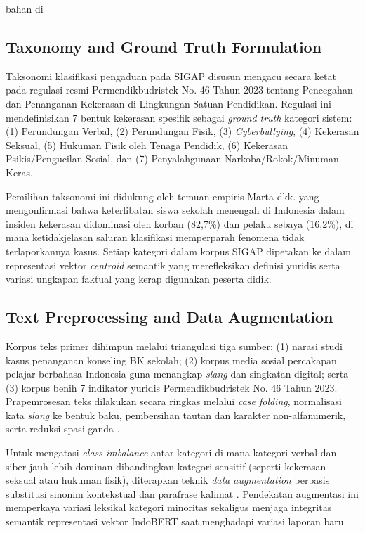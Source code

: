bahan di\documentclass[conference]{IEEEtran}
\begin{document}
\subsection{Taxonomy and Ground Truth Formulation}

Taksonomi klasifikasi pengaduan pada SIGAP disusun mengacu secara ketat pada regulasi resmi Permendikbudristek No. 46 Tahun 2023 tentang Pencegahan dan Penanganan Kekerasan di Lingkungan Satuan Pendidikan. Regulasi ini mendefinisikan 7 bentuk kekerasan spesifik sebagai \textit{ground truth} kategori sistem: (1) Perundungan Verbal, (2) Perundungan Fisik, (3) \textit{Cyberbullying}, (4) Kekerasan Seksual, (5) Hukuman Fisik oleh Tenaga Pendidik, (6) Kekerasan Psikis/Pengucilan Sosial, dan (7) Penyalahgunaan Narkoba/Rokok/Minuman Keras.

Pemilihan taksonomi ini didukung oleh temuan empiris Marta dkk. \cite{marta2026} yang mengonfirmasi bahwa keterlibatan siswa sekolah menengah di Indonesia dalam insiden kekerasan didominasi oleh korban (82,7\%) dan pelaku sebaya (16,2\%), di mana ketidakjelasan saluran klasifikasi memperparah fenomena tidak terlaporkannya kasus. Setiap kategori dalam korpus SIGAP dipetakan ke dalam representasi vektor \textit{centroid} semantik yang merefleksikan definisi yuridis serta variasi ungkapan faktual yang kerap digunakan peserta didik.

\subsection{Text Preprocessing and Data Augmentation}

Korpus teks primer dihimpun melalui triangulasi tiga sumber: (1) narasi studi kasus penanganan konseling BK sekolah; (2) korpus media sosial percakapan pelajar berbahasa Indonesia guna menangkap \textit{slang} dan singkatan digital; serta (3) korpus benih 7 indikator yuridis Permendikbudristek No. 46 Tahun 2023. Prapemrosesan teks dilakukan secara ringkas melalui \textit{case folding}, normalisasi kata \textit{slang} ke bentuk baku, pembersihan tautan dan karakter non-alfanumerik, serta reduksi spasi ganda \cite{jazuli2025}.

Untuk mengatasi \textit{class imbalance} antar-kategori di mana kategori verbal dan siber jauh lebih dominan dibandingkan kategori sensitif (seperti kekerasan seksual atau hukuman fisik), diterapkan teknik \textit{data augmentation} berbasis substitusi sinonim kontekstual dan parafrase kalimat \cite{tang2023}. Pendekatan augmentasi ini memperkaya variasi leksikal kategori minoritas sekaligus menjaga integritas semantik representasi vektor IndoBERT saat menghadapi variasi laporan baru.
\end{document}
